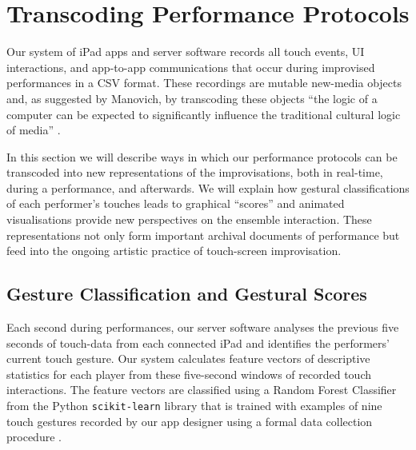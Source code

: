 \documentclass[graybox]{svmult}
\begin{document}
\section{Transcoding Performance Protocols}
\label{sec:analysis}

Our system of iPad apps and server software records all touch events,
UI interactions, and app-to-app communications that occur during
improvised performances in a CSV format. These
recordings are mutable new-media objects and, as suggested by Manovich,
by transcoding these objects ``the logic of a computer can be expected
to significantly influence the traditional cultural logic of
media'' \citep{Manovich:2002ly}.

In this section we will describe ways in which our performance
protocols can be transcoded into new representations of the
improvisations, both in real-time, during a performance, and
afterwards. We will explain how gestural classifications of each
performer's touches leads to graphical ``scores'' and animated
visualisations provide new perspectives on the ensemble interaction.
These representations not only form important archival documents of
performance but feed into the ongoing artistic practice of
touch-screen improvisation.

\subsection{Gesture Classification and Gestural Scores}
\label{subsec:gesture-classification}

Each second during performances, our server software analyses the
previous five seconds of touch-data from each connected iPad and
identifies the performers' current touch gesture. Our system
calculates feature vectors of descriptive statistics for each player
from these five-second windows of recorded touch interactions. The
feature vectors are classified using a Random Forest
Classifier \citep{Breiman:2001kx} from the Python \texttt{scikit-learn}
library \citep{scikit-learn} that is trained with examples of nine touch gestures recorded
by our app designer using a formal data collection
procedure \citep{Martin:2015jk}. 
\end{document}
